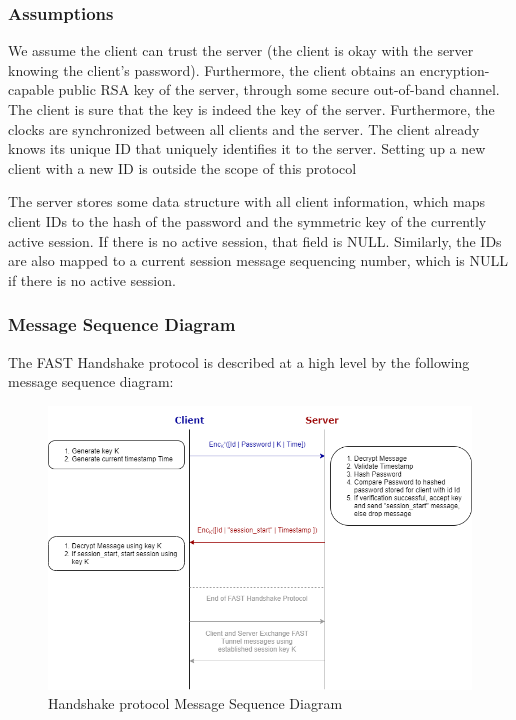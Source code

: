\documentclass[12pt]{article}
\begin{document}
\subsubsection{Assumptions}

We assume the client can trust the server (the client is okay with the server knowing the client’s password). Furthermore, the client obtains an encryption-capable public RSA key of the server, through some secure out-of-band channel. The client is sure that the key is indeed the key of the server. Furthermore, the clocks are synchronized between all clients and the server. The client already knows its unique ID that uniquely identifies it to the server. Setting up a new client with a new ID is outside the scope of this protocol

The server stores some data structure with all client information, which maps client IDs to the hash of the password and the symmetric key of the currently active session. If there is no active session, that field is NULL. Similarly, the IDs are also mapped to a current session message sequencing number, which is NULL if there is no active session.

\subsubsection{Message Sequence Diagram}

The FAST Handshake protocol is described at a high level by the following message sequence diagram:


\begin{figure}[h]
    \centering
    \includegraphics[width=\textwidth]{Handshake_MSC}
    \caption{Handshake protocol Message Sequence Diagram}
    \label{fig:handshake_msc}
\end{figure}
\end{document}
